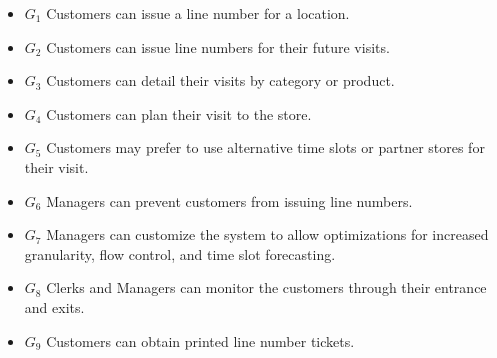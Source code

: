 \begin{itemize}
    \item \textbf{$G_{1}$} Customers can issue a line number for a location.
    \item \textbf{$G_{2}$} Customers can issue line numbers for their future visits.
    \item \textbf{$G_{3}$} Customers can detail their visits by category or product.
    \item \textbf{$G_{4}$} Customers can plan their visit to the store.
    \item \textbf{$G_{5}$} Customers may prefer to use alternative time slots or partner stores for their visit.
    \item \textbf{$G_{6}$} Managers can prevent customers from issuing line numbers.
    \item \textbf{$G_{7}$} Managers can customize the system to allow optimizations for increased granularity, flow control, and time slot forecasting.
    \item \textbf{$G_{8}$} Clerks and Managers can monitor the customers through their entrance and exits.
    \item \textbf{$G_{9}$} Customers can obtain printed line number tickets.
\end{itemize}




